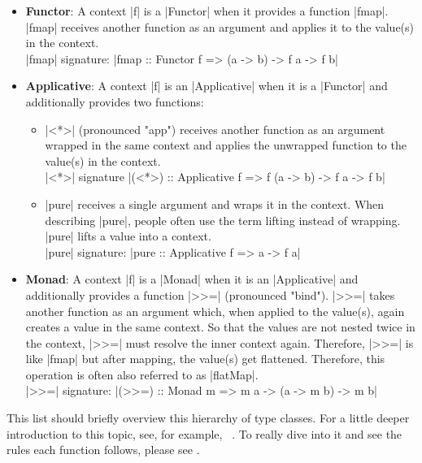 \begin{itemize}
  \item \textbf{Functor}: A context |f| is a |Functor| when it provides a function
|fmap|. |fmap| receives another function as an argument and applies it to the
value(s) in the context.\\
|fmap| signature: |fmap :: Functor f => (a -> b) -> f a -> f b|\\

\item \textbf{Applicative}: A context |f| is an |Applicative| when it is a |Functor|
and additionally provides two functions:
\begin{itemize}
  \item |<*>| (pronounced "app") receives another function as an
    argument wrapped in the same context and applies the unwrapped function to
    the value(s) in the context. \\
    |<*>| signature |(<*>) :: Applicative f => f (a -> b) -> f a -> f b|
  \item |pure| receives a single argument and wraps it in the context. When
    describing |pure|, people often use the term lifting instead of wrapping.
    |pure| lifts a value into a context.\\
    |pure| signature: |pure :: Applicative f => a -> f a| \\
\end{itemize}
\item \textbf{Monad}: A context |f| is a |Monad| when it is an |Applicative|
  and additionally provides a function |>>=| (pronounced "bind"). |>>=| takes
  another function as an argument which, when applied to the value(s), again
  creates a value in the same context. So that the values are not nested twice
  in the context, |>>=| must resolve the inner context again. Therefore, |>>=|
  is like |fmap| but after mapping, the value(s) get flattened. Therefore, this
  operation is often also referred to as |flatMap|.\\
|>>=| signature: |(>>=) :: Monad m => m a -> (a -> m b) -> m b|\\
\end{itemize}

This list should briefly overview this hierarchy of type classes. For a little
deeper introduction to this topic, see, for example, ~\cite{monads_adit_2013}.
To really dive into it and see the rules each function follows, please see
\cite[Chapter~12]{hutton_pih_2016}.

